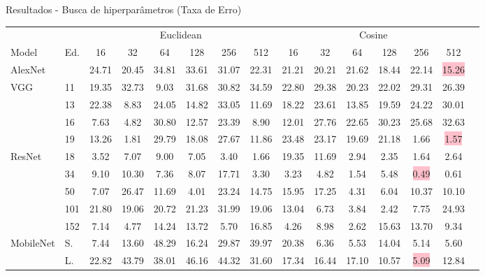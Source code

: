 \begin{frame}{Resultados - Busca de hiperparâmetros (Taxa de Erro)}
\begin{table}
\tiny
\centering
\setlength{\tabcolsep}{3pt}
\begin{tabular}{llcccccc|ccccccc}
\toprule
& & \multicolumn{6}{c}{Euclidean} & \multicolumn{6}{c}{Cosine} \\
\cmidrule(lr){3-8} \cmidrule(lr){9-14}
Model & Ed. & 16 & 32 & 64 & 128 & 256 & 512 & 16 & 32 & 64 & 128 & 256 & 512 \\
\midrule
AlexNet                 &   & 24.71 & 20.45 & 34.81 & 33.61 & 31.07 & 22.31 & 21.21 & 20.21 & 21.62 & 18.44 & 22.14 & \colorbox{pink}{15.26} \\
\midrule
\multirow{4}{*}{VGG}    & 11    & 19.35 & 32.73 & 9.03 & 31.68 & 30.82 & 34.59 & 22.80 & 29.38 & 20.23 & 22.02 & 29.31 & 26.39 \\
                        & 13    & 22.38 & 8.83 & 24.05 & 14.82 & 33.05 & 11.69 & 18.22 & 23.61 & 13.85 & 19.59 & 24.22 & 30.01 \\
                        & 16    & 7.63 & 4.82 & 30.80 & 12.57 & 23.39 & 8.90 & 12.01 & 27.76 & 22.65 & 30.23 & 25.68 & 32.63 \\
                        & 19    & 13.26 & 1.81 & 29.79 & 18.08 & 27.67 & 11.86 & 23.48 & 23.17 & 19.69 & 21.18 & 1.66 & \colorbox{pink}{1.57} \\
\midrule
\multirow{5}{*}{ResNet} & 18    & 3.52 & 7.07 & 9.00 & 7.05 & 3.40 & 1.66 & 19.35 & 11.69 & 2.94 & 2.35 & 1.64 & 2.64 \\
                        & 34    & 9.10 & 10.30 & 7.36 & 8.07 & 17.71 & 3.30 & 3.23 & 4.82 & 1.54 & 5.48 & \colorbox{pink}{0.49} & 0.61 \\
                        & 50    & 7.07 & 26.47 & 11.69 & 4.01 & 23.24 & 14.75 & 15.95 & 17.25 & 4.31 & 6.04 & 10.37 & 10.10 \\
                        & 101   & 21.80 & 19.06 & 20.72 & 21.23 & 31.99 & 19.06 & 13.04 & 6.73 & 3.84 & 2.42 & 7.75 & 24.93 \\
                        & 152   & 7.14 & 4.77 & 14.24 & 13.72 & 5.70 & 16.85 & 4.26 & 8.98 & 2.62 & 15.63 & 13.70 & 9.34 \\
\midrule
\multirow{2}{*}{MobileNet} & S. & 7.44 & 13.60 & 48.29 & 16.24 & 29.87 & 39.97 & 20.38 & 6.36 & 5.53 & 14.04 & 5.14 & 5.60 \\
                           & L. & 22.82 & 43.79 & 38.01 & 46.16 & 44.32 & 31.60 & 17.34 & 16.44 & 17.10 & 10.57 & \colorbox{pink}{5.09} & 12.84 \\

\end{tabular}
\end{table}
\end{frame}
